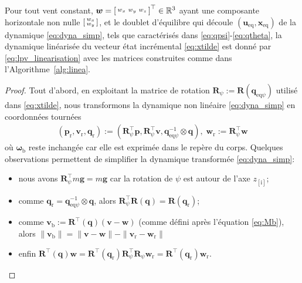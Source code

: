 \begin{theorem} \label{th:lin}
Pour tout vent constant, $\boldsymbol{w} =\left[ \begin{smallmatrix}w_x & w_y & w_z \end{smallmatrix} \right]^\top \in {\mathbb R}^3$ ayant une composante horizontale non nulle $\left[ \begin{smallmatrix}w_x \\ w_y \end{smallmatrix} \right]$, et le doublet d'équilibre qui découle $(\boldsymbol{u}_{\text{eq}}, \boldsymbol{x}_{\text{eq}})$ de la dynamique \eqref{eq:dyna_simp}, tels que caractérisés dans \eqref{eq:qpsi}-\eqref{eq:qtheta}, la dynamique linéarisée du vecteur état incrémental \eqref{eq:xtilde} est donné par \eqref{eq:lpv_linearisation} avec les matrices construites comme dans l'Algorithme~\ref{alg:linea}.
\end{theorem}
%
\begin{proof}
Tout d'abord, en exploitant la matrice de rotation 
$\boldsymbol{R}_{\psi} :=    \boldsymbol{R}(\boldsymbol{q}_{\mathrm{eq}\psi})$ utilisé dans \eqref{eq:xtilde}, nous transformons la dynamique non linéaire \eqref{eq:dyna_simp} en coordonnées tournées
\begin{align}
\label{eq:rotated_coord}
(\boldsymbol{p}_{\text{r}} ,
\boldsymbol{v}_{\text{r}} ,
\boldsymbol{q}_{\text{r}}
)
:=
\left(\boldsymbol{R}_{\psi}^\top
\boldsymbol{p},
\boldsymbol{R}_{\psi}^\top \boldsymbol{v},
\boldsymbol{q}_{\mathrm{eq}\psi}^{-1} \otimes
\boldsymbol{q}
\right), 
\; \boldsymbol{w}_{\text{r}}:=\boldsymbol{R}_{\psi}^\top\boldsymbol{w}
\end{align}
où $\boldsymbol{\omega}_{\text{b}}$ reste inchangée car elle est exprimée dans le repère du corps. 
Quelques observations permettent de simplifier
la dynamique transformée \eqref{eq:dyna_simp}:
\begin{itemize}
    \item nous avons $\boldsymbol{R}_{\psi}^\top
    m\boldsymbol{g} = m\boldsymbol{g}$ car la rotation de $\psi$ est autour de l'axe $z_{[\text{i}]}$;
    \item comme $\boldsymbol{q}_{\text{r}} = \boldsymbol{q}_{\mathrm{eq}\psi}^{-1} \otimes \boldsymbol{q}$, alors $\boldsymbol{R}_{\psi}^\top \boldsymbol{R}(\boldsymbol{q}) = \boldsymbol{R}(\boldsymbol{q}_{\text{r}})$; 
    \item comme $\boldsymbol{v}_{\text{b}} := \boldsymbol{R}^\top(\boldsymbol{q}) (\boldsymbol{v}-\boldsymbol{w})$ (comme défini après l'équation \eqref{eq:Mb}), alors $\| \boldsymbol{v}_{\text{b}} \| = \| \boldsymbol{v} -  \boldsymbol{w}  \| - \| \boldsymbol{v}_{\text{r}} -  \boldsymbol{w}_{\text{r}}  \|$
    \item enfin $\boldsymbol{R}^\top(\boldsymbol{q}) \boldsymbol{w} = \boldsymbol{R}^\top\! (\boldsymbol{q}_{\text{r}}) \boldsymbol{R}_{\psi}^\top\! \boldsymbol{R}_{\psi} \boldsymbol{w}_{\text{r}}= \boldsymbol{R}^\top \!(\boldsymbol{q}_{\text{r}}) \boldsymbol{w}_{\text{r}}$.
\end{itemize} 


\end{proof}
